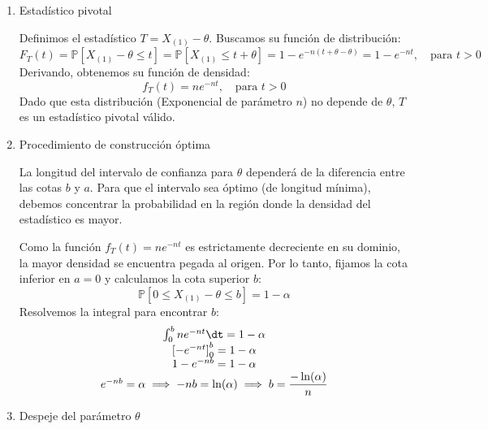 \begin{enumerate}[label=\color{red}\textbf{\arabic*)}]
\begin{enumerate}[label=\arabic*)]
		            Primero calculamos la función de distribución de $X$: \[
			            F_X(x)=\int_{\theta}^{x} e^{-(t-\theta)} \dt=[-e^{-(t-\theta)} ]_\theta^x=1-e^{-(x-\theta)}
		            \]
		            La función de distribución del mínimo $X_{(1)}$ se obtiene como: \[
			            F_{X_{(1)}}(t)=1-[1-F_X(t)]^n=1-[e^{-(t-\theta)} ]^n=1-e^{-n(t-\theta)}=1-e^{-nt},\quad\text{para }t>\theta
		            \]
		      \item Estadístico pivotal

		            Definimos el estadístico $T=X_{(1)}-\theta$. Buscamos su función de distribución: \[
			            F_T(t)=\mathbb{P}[X_{(1)}-\theta\le t]=\mathbb{P}[X_{(1)}\le t+\theta]=1-e^{-n(t+\theta-\theta)}=1-e^{-nt},\quad \text{para }t>0
		            \]
		            Derivando, obtenemos su función de densidad: \[
			            f_T(t)=ne^{-nt},\quad \text{para }t>0
		            \]
		            Dado que esta distribución (Exponencial de parámetro $n$) no depende de $\theta,\,T$ es un estadístico pivotal válido.
		      \item Procedimiento de construcción óptima

		            La longitud del intervalo de confianza para $\theta$ dependerá de la diferencia entre las cotas $b$ y $a$. Para que el intervalo sea óptimo (de longitud mínima), debemos concentrar la probabilidad en la región donde la densidad del estadístico es mayor.

		            Como la función $f_T(t)=ne^{-nt}$ es estrictamente decreciente en su dominio, la mayor densidad se encuentra pegada al origen. Por lo tanto, fijamos la cota inferior en $a=0$ y calculamos la cota superior $b$: \[
			            \mathbb{P}[0\le X_{(1)}-\theta\le b]=1-\alpha
		            \]
		            Resolvemos la integral para encontrar $b$: \[
			            \begin{array}{c}
				            \int_{0}^{b} ne^{-nt}\dt=1-\alpha       \\
				            \left[-e^{-nt} \right]_{0}^{b}=1-\alpha \\
				            1-e^{-nb}=1-\alpha                      \\
				            e^{-nb}=\alpha\implies -nb=\ln(\alpha)\implies b=\dfrac{-\ln(\alpha)}{n}
			            \end{array}
		            \]
		      \item Despeje del parámetro $\theta$


\end{enumerate}
\end{enumerate}
